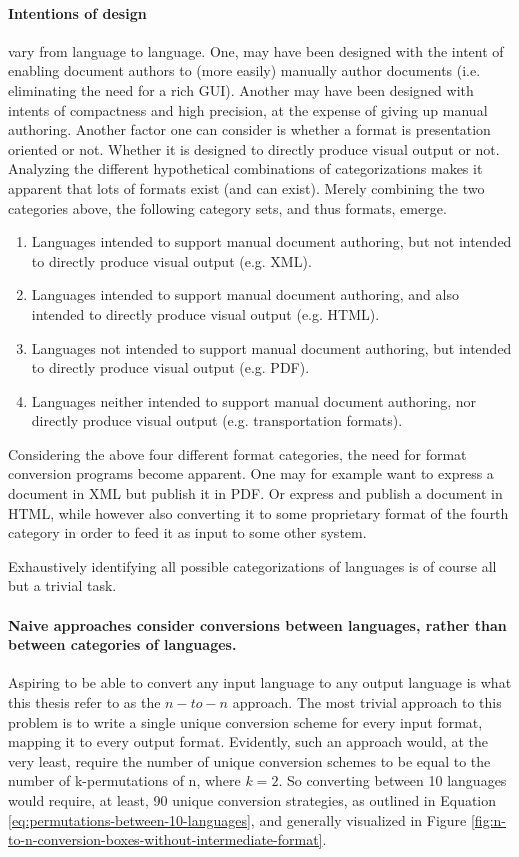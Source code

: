 \documentclass{scrreprt}
\begin{document}
\paragraph{Intentions of design} vary from language to language. One, may have been designed with the intent of enabling document authors to (more easily) manually author documents (i.e. eliminating the need for a rich GUI). Another may have been designed with intents of compactness and high precision, at the expense of giving up manual authoring. Another factor one can consider is whether a format is presentation oriented or not. Whether it is designed to directly produce visual output or not. Analyzing the different hypothetical combinations of categorizations makes it apparent that lots of formats exist (and can exist). Merely combining the two categories above, the following category sets, and thus formats, emerge.

\begin{enumerate}
\item Languages intended to support manual document authoring, but not intended to directly produce visual output (e.g. XML).
\item Languages intended to support manual document authoring, and also intended to directly produce visual output (e.g. HTML).
\item Languages not intended to support manual document authoring, but intended to directly produce visual output (e.g. PDF).
\item Languages neither intended to support manual document authoring, nor directly produce visual output (e.g. transportation formats).
\end{enumerate}

Considering the above four different format categories, the need for format conversion programs become apparent. One may for example want to express a document in XML but publish it in PDF. Or express and publish a document in HTML, while however also converting it to some proprietary format of the fourth category in order to feed it as input to some other system.

Exhaustively identifying all possible categorizations of languages is of course all but a trivial task.

\paragraph{Naive approaches consider conversions between languages, rather than between categories of languages. } Aspiring to be able to convert any input language to any output language is what this thesis refer to as the $n-to-n$ approach. The most trivial approach to this problem is to write a single unique conversion scheme for every input format, mapping it to every output format. Evidently, such an approach would, at the very least, require the number of unique  conversion schemes to be equal to the number of k-permutations of n, where $k=2$. So converting between 10 languages would require, at least, 90 unique conversion strategies, as outlined in Equation \ref{eq:permutations-between-10-languages}, and generally visualized in Figure \ref{fig:n-to-n-conversion-boxes-without-intermediate-format}.
\end{document}

